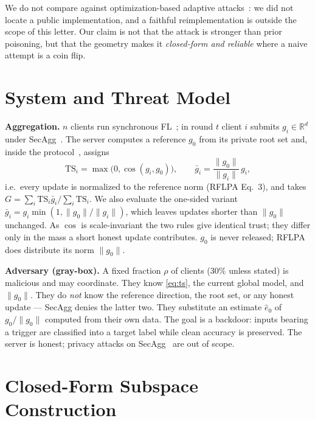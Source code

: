 \documentclass{article}
\begin{document}
We do not compare against optimization-based adaptive attacks~\cite{autoadapt}:
we did not locate a public implementation, and a faithful reimplementation is
outside the scope of this letter. Our claim is not that the attack is stronger than prior poisoning, but that the geometry makes it \emph{closed-form and reliable} where a naive attempt is a coin flip.

\section{System and Threat Model}
\label{sec:model}
\noindent\textbf{Aggregation.} $n$ clients run synchronous FL~\cite{fedavg}; in round $t$ client $i$ submits $g_i\in\mathbb{R}^d$ under SecAgg~\cite{secagg}. The server computes a reference
$g_0$ from its private root set and, inside the protocol~\cite{rflpa}, assigns
\begin{equation}
  \mathrm{TS}_i=\max\!\bigl(0,\cos(g_i,g_0)\bigr),\qquad
  \bar g_i=\frac{\|g_0\|}{\|g_i\|}\,g_i ,
  \label{eq:ts}
\end{equation}
i.e.\ every update is normalized to the reference norm (RFLPA Eq.~3), and takes
$G=\sum_i\mathrm{TS}_i\bar g_i/\sum_i\mathrm{TS}_i$. We also evaluate the
one-sided variant $\bar g_i=g_i\min(1,\|g_0\|/\|g_i\|)$, which leaves updates
shorter than $\|g_0\|$ unchanged. As $\cos$ is scale-invariant the two rules give
identical trust; they differ only in the mass a short honest update contributes.
$g_0$ is never released; RFLPA does distribute its norm $\|g_0\|$.

\noindent\textbf{Adversary (gray-box).} A fixed fraction $\rho$ of clients
($30\%$ unless stated) is malicious and may coordinate. They know \eqref{eq:ts},
the current global model, and $\|g_0\|$. They do \emph{not} know the reference
direction, the root set, or any honest update --- SecAgg denies the latter two.
They substitute an estimate $\hat e_0$ of $g_0/\|g_0\|$ computed from their own
data. The goal is a backdoor: inputs bearing a trigger are classified into a
target label while clean accuracy is preserved. The server is honest; privacy
attacks on SecAgg~\cite{graddisagg,eluding} are out of scope.

\section{Closed-Form Subspace Construction}
\label{sec:attack}
\end{document}
